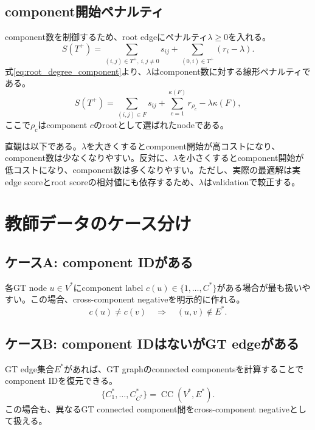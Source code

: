 \documentclass[11pt,a4paper]{article}
\begin{document}
\subsection{component開始ペナルティ}
component数を制御するため、root edgeにペナルティ$\lambda\ge 0$を入れる。
\begin{equation}
  S(T^+)
  =
  \sum_{(i,j)\in T^+,\ i,j\neq 0} s_{ij}
  +
  \sum_{(0,i)\in T^+} (r_i-\lambda).
  \label{eq:tree_score_lambda}
\end{equation}
式\eqref{eq:root_degree_component}より、$\lambda$はcomponent数に対する線形ペナルティである。
\begin{equation}
  S(T^+)
  =
  \sum_{(i,j)\in F} s_{ij}
  +
  \sum_{c=1}^{\kappa(F)} r_{\rho_c}
  -
  \lambda\kappa(F),
\end{equation}
ここで$\rho_c$はcomponent $c$のrootとして選ばれたnodeである。

直観は以下である。$\lambda$を大きくするとcomponent開始が高コストになり、component数は少なくなりやすい。反対に、$\lambda$を小さくするとcomponent開始が低コストになり、component数は多くなりやすい。ただし、実際の最適解は実edge scoreとroot scoreの相対値にも依存するため、$\lambda$はvalidationで較正する。

\section{教師データのケース分け}
\subsection{ケースA: component IDがある}
各GT node $u\in V^*$にcomponent label $c(u)\in\{1,\ldots,C^*\}$がある場合が最も扱いやすい。この場合、cross-component negativeを明示的に作れる。
\begin{equation}
  c(u)\neq c(v)\quad\Rightarrow\quad (u,v)\notin E^*.
\end{equation}

\subsection{ケースB: component IDはないがGT edgeがある}
GT edge集合$E^*$があれば、GT graphのconnected componentsを計算することでcomponent IDを復元できる。
\begin{equation}
  \{C_1^*,\ldots,C_{C^*}^*\}=\operatorname{CC}(V^*,E^*).
\end{equation}
この場合も、異なるGT connected component間をcross-component negativeとして扱える。
\end{document}
